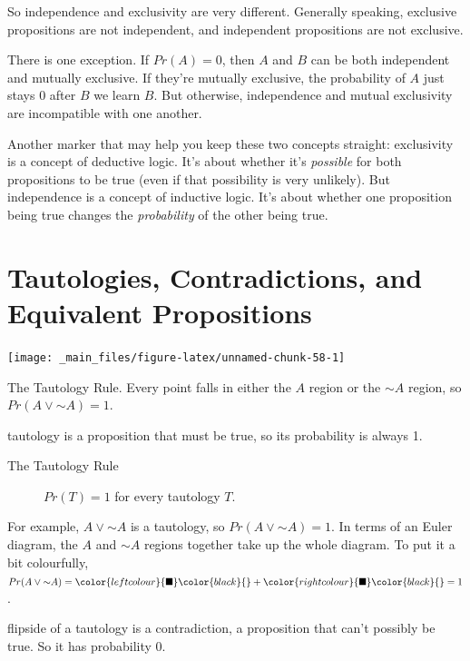\documentclass[justified]{tufte-book}
\renewcommand{\neg}{\mathbin{\sim}}
\newcommand{\p}{Pr}
\theoremstyle{definition}
\theoremstyle{definition}
\theoremstyle{definition}
\theoremstyle{remark}
\begin{document}
So independence and exclusivity are very different. Generally speaking,
exclusive propositions are not independent, and independent propositions
are not exclusive.

There is one exception. If \(\p(A) = 0\), then \(A\) and \(B\) can be
both independent and mutually exclusive. If they're mutually exclusive,
the probability of \(A\) just stays \(0\) after \(B\) we learn \(B\).
But otherwise, independence and mutual exclusivity are incompatible with
one another.

Another marker that may help you keep these two concepts straight:
exclusivity is a concept of deductive logic. It's about whether it's
\emph{possible} for both propositions to be true (even if that
possibility is very unlikely). But independence is a concept of
inductive logic. It's about whether one proposition being true changes
the \emph{probability} of the other being true.

\hypertarget{tautologies-contradictions-and-equivalent-propositions}{%
\section{Tautologies, Contradictions, and Equivalent
Propositions}\label{tautologies-contradictions-and-equivalent-propositions}}

\begin{marginfigure}
\texttt{[image: \_main\_files/figure-latex/unnamed-chunk-58-1]} \caption[The Tautology Rule]{The Tautology Rule. Every point falls in either the $A$ region or the $\neg A$ region, so $\p(A \vee \neg A) = 1$.}\label{fig:unnamed-chunk-58}
\end{marginfigure}

 tautology is a proposition that must be true, so its
probability is always 1.

\begin{description}
\item[The Tautology Rule]
\(\p(T) = 1\) for every tautology \(T\).
\end{description}

For example, \(A \vee \neg A\) is a tautology, so
\(\p(A \vee \neg A) = 1\). In terms of an Euler diagram, the \(A\) and
\(\neg A\) regions together take up the whole diagram. To put it a bit
colourfully,
\(\p(A \vee \neg A) = \color{leftcolour}{\blacksquare}\color{black}{} + \color{rightcolour}{\blacksquare}\color{black}{} = 1\).

 flipside of a tautology is a contradiction, a
proposition that can't possibly be true. So it has probability 0.
\end{document}
